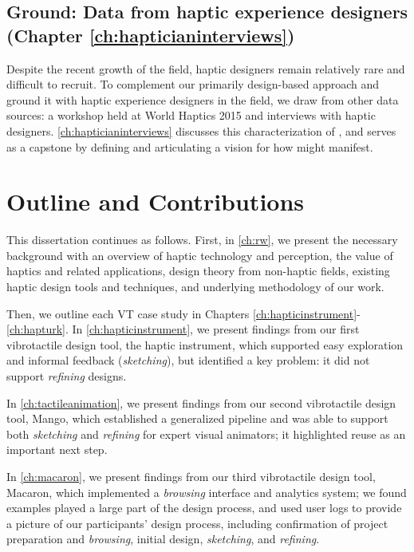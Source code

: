 \subsection{Ground: Data from haptic experience designers (Chapter \ref{ch:hapticianinterviews})}
Despite the recent growth of the field, haptic designers remain relatively rare and difficult to recruit.
To complement our primarily design-based approach and ground it with haptic experience designers in the field, we draw from other data sources: a workshop held at World Haptics 2015 and interviews with haptic designers.
\autoref{ch:hapticianinterviews} discusses this characterization of \haxd, and serves as a capstone by defining \haxd and articulating a vision for how \haxd might manifest.




\section{Outline and Contributions}
This dissertation continues as follows.
First, in \autoref{ch:rw}, we present the necessary background with an overview of haptic technology and perception, the value of haptics and related applications,  design theory from non-haptic fields,  existing haptic design tools and techniques, and underlying methodology of our work.

Then, we outline each VT case study in Chapters \ref{ch:hapticinstrument}-\ref{ch:hapturk}.
In \autoref{ch:hapticinstrument}, we present findings from our first vibrotactile design tool, the haptic instrument, which supported easy exploration and informal feedback (\emph{sketching}), but identified a key problem: it did not support \emph{refining} designs.

In \autoref{ch:tactileanimation}, we present findings from our second vibrotactile design tool, Mango, which established a generalized pipeline and was able to support both \emph{sketching} and \emph{refining} for expert visual animators; it highlighted reuse as an important next step.

In \autoref{ch:macaron}, we present findings from our third vibrotactile design tool, Macaron, which implemented a \emph{browsing} interface and analytics system; we found examples played a large part of the design process, and used user logs to provide a picture of our participants' design process, including confirmation of project preparation and \emph{browsing}, initial design, \emph{sketching}, and \emph{refining}.

